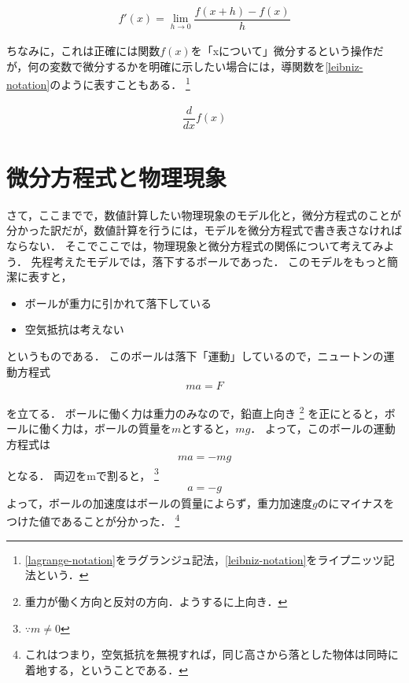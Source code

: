 \begin{align}
f'(x) = \lim_{h \to 0} \dfrac{f(x+h)-f(x)}{h}
\label{lagrange-notation}
\end{align}

ちなみに，これは正確には関数$f(x)$を「xについて」微分するという操作だが，何の変数で微分するかを明確に示したい場合には，導関数を\ref{leibniz-notation}のように表すこともある．
\footnote{\ref{lagrange-notation}をラグランジュ記法，\ref{leibniz-notation}をライプニッツ記法という．}

\begin{align}
\dfrac{d}{dx} f(x)
\label{leibniz-notation}
\end{align}



\section{微分方程式と物理現象}
さて，ここまでで，数値計算したい物理現象のモデル化と，微分方程式のことが分かった訳だが，数値計算を行うには，モデルを微分方程式で書き表さなければならない．
そこでここでは，物理現象と微分方程式の関係について考えてみよう．
先程考えたモデルでは，落下するボールであった．
このモデルをもっと簡潔に表すと，
\begin{itemize}
	\item{ボールが重力に引かれて落下している}
    \item{空気抵抗は考えない}
\end{itemize}
というものである．
このボールは落下「運動」しているので，ニュートンの運動方程式
\begin{align}
ma = F
\end{align}

を立てる．
ボールに働く力は重力のみなので，鉛直上向き
\footnote{重力が働く方向と反対の方向．ようするに上向き．}
を正にとると，ボールに働く力は，ボールの質量を$m$とすると，$mg$．
よって，このボールの運動方程式は
\begin{align}
ma = -mg
\end{align}
となる．
両辺をmで割ると，
\footnote{$\because m\neq 0$}
\begin{align}
a = -g
\label{ball-acc}
\end{align}
よって，ボールの加速度はボールの質量によらず，重力加速度$g$のにマイナスをつけた値であることが分かった．
\footnote{これはつまり，空気抵抗を無視すれば，同じ高さから落とした物体は同時に着地する，ということである．}


